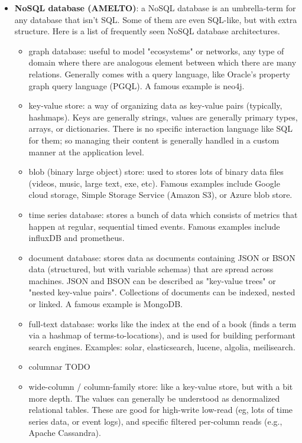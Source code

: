 \documentclass{article}
\begin{document}
\begin{itemize}
	\item \textbf{NoSQL database (AMELTO)}: a NoSQL database is an umbrella-term for any database that isn't SQL. Some of them are even SQL-like, but with extra structure. Here is a list of frequently seen NoSQL database architectures.
	\begin{itemize}
		\item graph database: useful to model "ecosystems" or networks, any type of domain where there are analogous element between which there are many relations. Generally comes with a query language, like Oracle's property graph query language (PGQL). A famous example is neo4j.

		\item key-value store: a way of organizing data as key-value pairs (typically, hashmaps). Keys are generally strings, values are generally primary types, arrays, or dictionaries. There is no specific interaction language like SQL for them; so managing their content is generally handled in a custom manner at the application level.

		\item blob (binary large object) store: used to stores lots of binary data files (videos, music, large text, exe, etc). Famous examples include Google cloud storage, Simple Storage Service (Amazon S3), or Azure blob store.

		\item time series database: stores a bunch of data which consists of metrics that happen at regular, sequential timed events. Famous examples include influxDB and prometheus.

		\item document database: stores data as documents containing JSON or BSON data (structured, but with variable schemas) that are spread across machines. JSON and BSON can be described as "key-value trees" or "nested key-value pairs". Collections of documents can be indexed, nested or linked. A famous example is MongoDB.

		\item full-text database: works like the index at the end of a book (finds a term via a hashmap of terms-to-locations), and is used for building performant search engines. Examples: solar, elasticsearch, lucene, algolia, meilisearch.

		\item columnar TODO

		\item wide-column / column-family store: like a key-value store, but with a bit more depth. The values can generally be understood as denormalized relational tables. These are good for high-write low-read (eg, lots of time series data, or event logs), and specific filtered per-column reads (e.g., Apache Cassandra).


\end{itemize}
\end{itemize}
\end{document}
